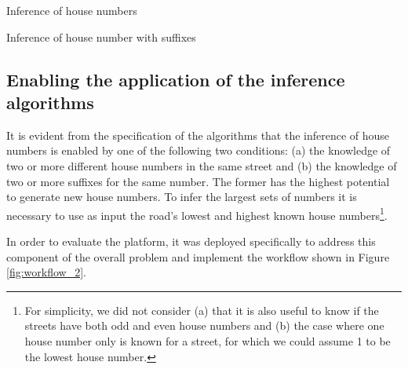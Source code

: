 \vspace{5mm}

\begin{algorithm}[H]
    \caption{Inference of house numbers}
    \label{algo:inference-numbers}
\end{algorithm}

\vspace{5mm}

\begin{algorithm}[H]
    \caption{Inference of house number with suffixes}
    \label{algo:inference-numbers-suffix}
\end{algorithm}

\subsection{Enabling the application of the inference algorithms} 

It is evident from the specification of the algorithms that the inference of house numbers is enabled by one of the following two conditions: (a) the knowledge of two or more different house numbers in the same street and (b) the knowledge of two or more suffixes for the same number. The former has the highest potential to generate new house numbers. To infer the largest sets of numbers it is necessary to use as input the road's lowest and highest known house numbers\footnote{For simplicity, we did not consider (a) that it is also useful to know if the streets have both odd and even house numbers and (b) the case where one house number only is known for a street, for which we could assume 1 to be the lowest house number.}.

In order to evaluate the platform, it was deployed specifically to address this component of the overall problem and implement the workflow shown in Figure \ref{fig:workflow_2}.

